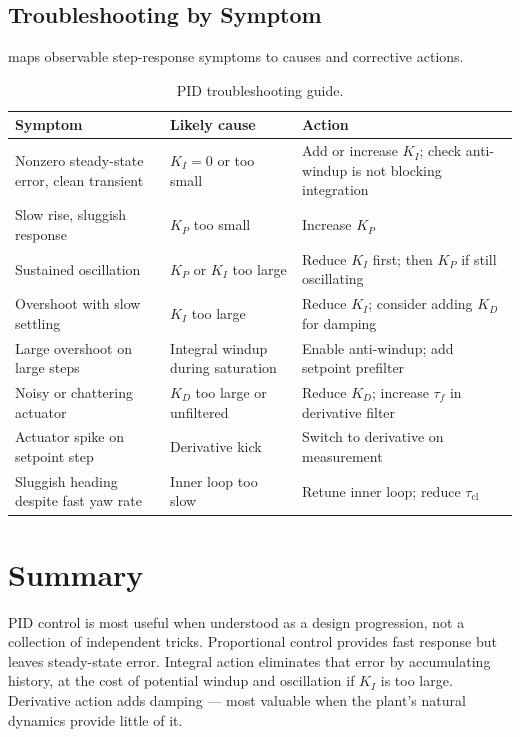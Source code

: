 \documentclass[../../book.tex]{subfiles}
\begin{document}
\subsection{Troubleshooting by Symptom}

 maps observable step-response symptoms to causes and
corrective actions.

\begin{table}[htbp]
\centering
\caption{PID troubleshooting guide.}
\label{tab:troubleshoot}
\begin{tabular}{p{4cm}p{3.5cm}p{5cm}}
\toprule
Symptom & Likely cause & Action \\
\midrule
Nonzero steady-state error, clean transient
  & $K_I = 0$ or too small
  & Add or increase $K_I$; check anti-windup is not blocking integration \\[4pt]
Slow rise, sluggish response
  & $K_P$ too small
  & Increase $K_P$ \\[4pt]
Sustained oscillation
  & $K_P$ or $K_I$ too large
  & Reduce $K_I$ first; then $K_P$ if still oscillating \\[4pt]
Overshoot with slow settling
  & $K_I$ too large
  & Reduce $K_I$; consider adding $K_D$ for damping \\[4pt]
Large overshoot on large steps
  & Integral windup during saturation
  & Enable anti-windup; add setpoint prefilter \\[4pt]
Noisy or chattering actuator
  & $K_D$ too large or unfiltered
  & Reduce $K_D$; increase $\tau_f$ in derivative filter \\[4pt]
Actuator spike on setpoint step
  & Derivative kick
  & Switch to derivative on measurement \\[4pt]
Sluggish heading despite fast yaw rate
  & Inner loop too slow
  & Retune inner loop; reduce $\tau_\mathrm{cl}$ \\
\bottomrule
\end{tabular}
\end{table}


\section{Summary}
\label{sec:summary}

PID control is most useful when understood as a design progression, not a
collection of independent tricks.  Proportional control provides fast response
but leaves steady-state error.  Integral action eliminates that error by
accumulating history, at the cost of potential windup and oscillation if
$K_I$ is too large.  Derivative action adds damping --- most valuable when the
plant's natural dynamics provide little of it.
\end{document}
